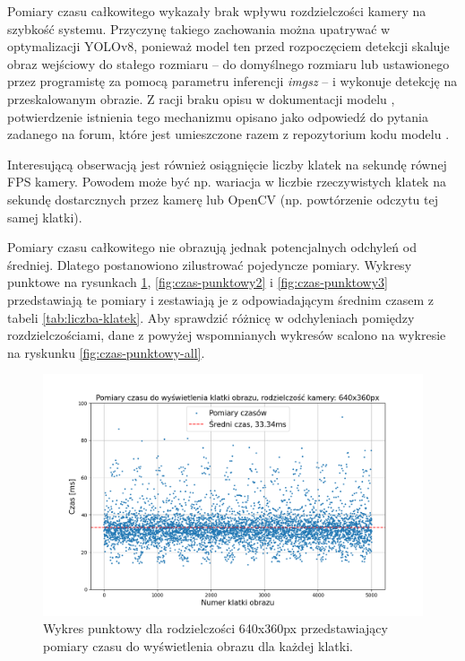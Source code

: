 Pomiary czasu całkowitego wykazały brak wpływu rozdzielczości kamery na szybkość systemu. Przyczynę takiego zachowania można upatrywać w optymalizacji YOLOv8, ponieważ model ten przed rozpoczęciem detekcji skaluje obraz wejściowy do stałego rozmiaru -- do domyślnego rozmiaru lub ustawionego przez programistę za pomocą parametru inferencji \emph{imgsz} -- i wykonuje detekcję na przeskalowanym obrazie. Z racji braku opisu w dokumentacji modelu \cite{yolo_docs}, potwierdzenie istnienia tego mechanizmu opisano jako odpowiedź do pytania zadanego na forum, które jest umieszczone razem z repozytorium kodu modelu \cite{github_imgsz}.

Interesującą obserwacją jest również osiągnięcie liczby klatek na sekundę równej FPS kamery. Powodem może być np. wariacja w liczbie rzeczywistych klatek na sekundę dostarcznych przez kamerę lub OpenCV (np. powtórzenie odczytu tej samej klatki).

Pomiary czasu całkowitego nie obrazują jednak potencjalnych odchyleń od średniej. Dlatego postanowiono zilustrować pojedyncze pomiary. Wykresy punktowe na rysunkach \ref{fig:czas-punktowy1}, \ref{fig:czas-punktowy2} i \ref{fig:czas-punktowy3} przedstawiają te pomiary  i zestawiają je z odpowiadającym średnim czasem z tabeli \ref{tab:liczba-klatek}. Aby sprawdzić różnicę w odchyleniach pomiędzy rozdzielczościami, dane z powyżej wspomnianych wykresów scalono na wykresie na ryskunku \ref{fig:czas-punktowy-all}.  


\begin{figure}[H]
    \centering
    \includegraphics[width=\linewidth]{r_test_szybkosci/punkty/1.png}
    \caption{Wykres punktowy dla rodzielczości 640x360px przedstawiający pomiary czasu do wyświetlenia obrazu dla każdej klatki.}
    \label{fig:czas-punktowy1}    
\end{figure}

